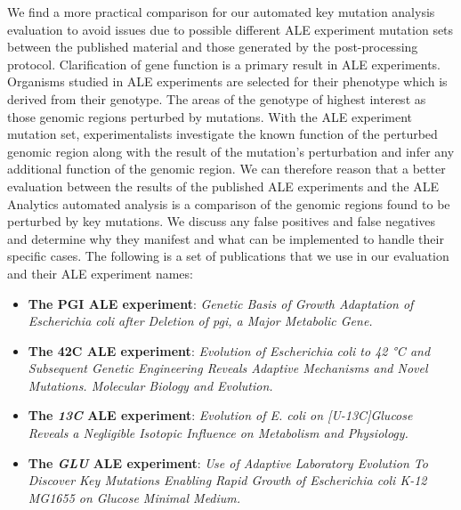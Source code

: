 \documentclass[12pt,final,masters,chapterheads]{ucsd}  %
\begin{document}
%
%
We find a more practical comparison for our automated key mutation analysis evaluation to avoid issues due to possible different ALE experiment mutation sets between the published material and those generated by the post-processing protocol. Clarification of gene function is a primary result in ALE experiments. Organisms studied in ALE experiments are selected for their phenotype which is derived from their genotype. The areas of the genotype of highest interest as those genomic regions perturbed by mutations. With the ALE experiment mutation set, experimentalists investigate the known function of the perturbed genomic region along with the result of the mutation's perturbation and infer any additional function of the genomic region. We can therefore reason that a better evaluation between the results of the published ALE experiments and the ALE Analytics automated analysis is a comparison of the genomic regions found to be perturbed by key mutations. We discuss any false positives and false negatives and determine why they manifest and what can be implemented to handle their specific cases. The following is a set of publications that we use in our evaluation and their ALE experiment names:
\begin{itemize}
\item \textbf{The PGI ALE experiment}: \textit{Genetic Basis of Growth Adaptation of Escherichia coli after Deletion of pgi, a Major Metabolic Gene.} \cite{10.1371/journal.pgen.1001186}
\item \textbf{The 42C ALE experiment}: \textit{Evolution of Escherichia coli to 42 °C and Subsequent Genetic Engineering Reveals Adaptive Mechanisms and Novel Mutations. Molecular Biology and Evolution.} \cite{pmid25015645}
\item \textbf{The \textit{13C }ALE experiment}: \textit{Evolution of E. coli on [U-13C]Glucose Reveals a Negligible Isotopic Influence on Metabolism and Physiology.} \cite{pmid26964043}
\item \textbf{The \textit{GLU }ALE experiment}: \textit{Use of Adaptive Laboratory Evolution To Discover Key Mutations Enabling Rapid Growth of Escherichia coli K-12 MG1655 on Glucose Minimal Medium.} \cite{pmid25304508}
\end{itemize}
\end{document}
